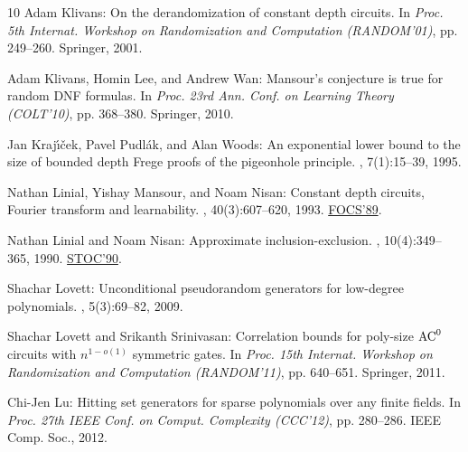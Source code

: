 \documentclass[11pt]{article}
\numberwithin{equation}{section}
\theoremstyle{definition}
\theoremstyle{plain}
\theoremstyle{plain}
\begin{document}
\begin{thebibliography}{10}
{\sc Adam Klivans}: On the derandomization of constant depth circuits.
\newblock In {\em Proc. 5th Internat. Workshop on Randomization and Computation
  (RANDOM'01)}, pp. 249--260. Springer, 2001.
\newblock [\epfmtdoi{10.1007/3-540-44666-4\_28}]

{\sc Adam Klivans, Homin Lee, and Andrew Wan}: Mansour's conjecture is true for
  random {DNF} formulas.
\newblock In {\em Proc. 23rd Ann. Conf. on Learning Theory (COLT'10)}, pp.
  368--380. Springer, 2010.

{\sc Jan Kraj{\'\i}{\v{c}}ek, Pavel Pudl{\'a}k, and Alan Woods}: An exponential
  lower bound to the size of bounded depth {F}rege proofs of the pigeonhole
  principle.
, 7(1):15--39, 1995.

{\sc Nathan Linial, Yishay Mansour, and Noam Nisan}: Constant depth circuits,
  {F}ourier transform and learnability.
, 40(3):607--620, 1993.
\newblock \prelim \href{https://doi.org/10.1109/SFCS.1989.63537}{FOCS'89}.
\newblock [\epfmtdoi{10.1145/174130.174138}]

{\sc Nathan Linial and Noam Nisan}: Approximate inclusion-exclusion.
, 10(4):349--365, 1990.
\newblock \prelim \href{https://doi.org/10.1145/100216.100250}{STOC'90}.
\newblock [\epfmtdoi{10.1007/BF02128670}]

{\sc Shachar Lovett}: Unconditional pseudorandom generators for low-degree
  polynomials.
, 5(3):69--82, 2009.

{\sc Shachar Lovett and Srikanth Srinivasan}: Correlation bounds for poly-size
  {${\rm AC}^0$} circuits with {$n^{1-o(1)}$} symmetric gates.
\newblock In {\em Proc. 15th Internat. Workshop on Randomization and
  Computation (RANDOM'11)}, pp. 640--651. Springer, 2011.
\newblock [\epfmtdoi{10.1007/978-3-642-22935-0\_54}]

{\sc Chi-Jen Lu}: Hitting set generators for sparse polynomials over any finite
  fields.
\newblock In {\em Proc. 27th IEEE Conf. on Comput. Complexity (CCC'12)}, pp.
  280--286. IEEE Comp. Soc., 2012.


\end{thebibliography}
\end{document}
